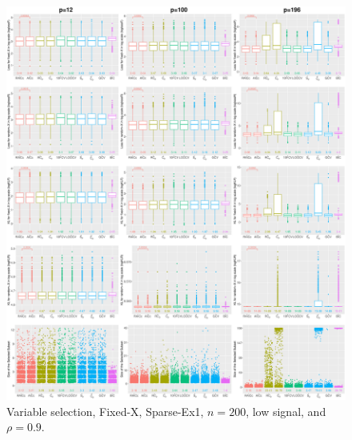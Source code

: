 \begin{figure}[!ht]
\centering
\includegraphics[width=\textwidth]{figures/supplement/fixedx/subset_selection/Sparse-Ex1_n200_lsnr_rho09.eps}
\caption{Variable selection, Fixed-X, Sparse-Ex1, $n=200$, low signal, and $\rho=0.9$.}
\end{figure}
\clearpage
